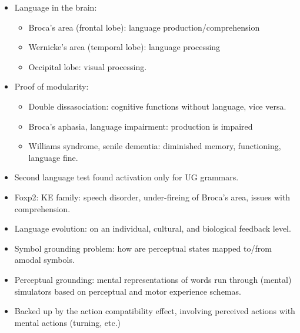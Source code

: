 \documentclass[11pt]{article}
\newenvironment{itemise}{
\begin{itemize}
  \setlength{\itemsep}{1pt}
  \setlength{\parskip}{0pt}
  \setlength{\parsep}{0pt}
}{\end{itemize}}
\begin{document}
\begin{itemise}
\begin{itemise}
 \item Behaviouralist: non-inferential, encapsulated.
 \item Fodor: inferential but encapsulated. Modules are:
 \begin{itemise}
 \item domain specific, innately specified, informationally encapsulated, fast, hardwired, autonomous, not assembled.
 \item Three types: transducers (physical to neural), input system (modular), central system.
 \end{itemise}
 \end{itemise}
 \item Language in the brain:
 \begin{itemise}
 \item Broca's area (frontal lobe): language production/comprehension
 \item Wernicke's area (temporal lobe): language processing
 \item Occipital lobe: visual processing.
 \end{itemise}
 \item Proof of modularity:
  \begin{itemise}
  \item Double dissasociation: cognitive functions without language, vice versa.
  \item Broca's aphasia, language impairment: production is impaired
  \item Williams syndrome, senile dementia: diminished memory, functioning, language fine.
 \end{itemise}
 \item Second language test found activation only for UG grammars.
 \item Foxp2: KE family: speech disorder, under-fireing of Broca's area, issues with comprehension.
 \item Language evolution: on an individual, cultural, and biological feedback level.
 \item Symbol grounding problem: how are perceptual states mapped to/from amodal symbols. 
 \item Perceptual grounding: mental representations of words run through (mental) simulators based on perceptual and motor experience schemas. 
 \item Backed up by the action compatibility effect, involving perceived actions with mental actions (turning, etc.)
 \end{itemise}
\end{document}
